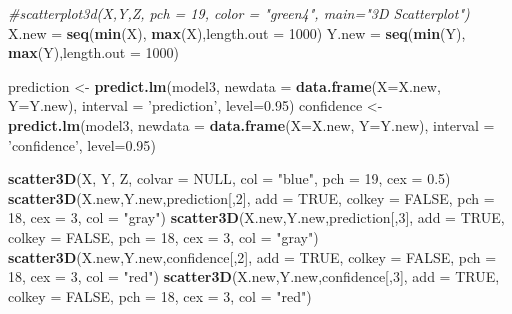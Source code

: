 \documentclass[]{article}
\newenvironment{Shaded}{\begin{snugshade}}{\end{snugshade}}
\newcommand{\KeywordTok}[1]{\textcolor[rgb]{0.13,0.29,0.53}{\textbf{{#1}}}}
\newcommand{\DataTypeTok}[1]{\textcolor[rgb]{0.13,0.29,0.53}{{#1}}}
\newcommand{\DecValTok}[1]{\textcolor[rgb]{0.00,0.00,0.81}{{#1}}}
\newcommand{\FloatTok}[1]{\textcolor[rgb]{0.00,0.00,0.81}{{#1}}}
\newcommand{\StringTok}[1]{\textcolor[rgb]{0.31,0.60,0.02}{{#1}}}
\newcommand{\CommentTok}[1]{\textcolor[rgb]{0.56,0.35,0.01}{\textit{{#1}}}}
\newcommand{\OtherTok}[1]{\textcolor[rgb]{0.56,0.35,0.01}{{#1}}}
\newcommand{\NormalTok}[1]{{#1}}
\begin{document}
\begin{Shaded}
\begin{Highlighting}[]
\CommentTok{#scatterplot3d(X,Y,Z, pch = 19, color = "green4", main="3D Scatterplot")}
\NormalTok{X.new =}\StringTok{ }\KeywordTok{seq}\NormalTok{(}\KeywordTok{min}\NormalTok{(X), }\KeywordTok{max}\NormalTok{(X),}\DataTypeTok{length.out =} \DecValTok{1000}\NormalTok{)}
\NormalTok{Y.new =}\StringTok{ }\KeywordTok{seq}\NormalTok{(}\KeywordTok{min}\NormalTok{(Y), }\KeywordTok{max}\NormalTok{(Y),}\DataTypeTok{length.out =} \DecValTok{1000}\NormalTok{)}

\NormalTok{prediction <-}\StringTok{ }\KeywordTok{predict.lm}\NormalTok{(model3, }\DataTypeTok{newdata =} \KeywordTok{data.frame}\NormalTok{(}\DataTypeTok{X=}\NormalTok{X.new, }\DataTypeTok{Y=}\NormalTok{Y.new),}
                         \DataTypeTok{interval =} \StringTok{'prediction'}\NormalTok{, }\DataTypeTok{level=}\FloatTok{0.95}\NormalTok{)}
\NormalTok{confidence <-}\StringTok{ }\KeywordTok{predict.lm}\NormalTok{(model3, }\DataTypeTok{newdata =} \KeywordTok{data.frame}\NormalTok{(}\DataTypeTok{X=}\NormalTok{X.new, }\DataTypeTok{Y=}\NormalTok{Y.new),}
                         \DataTypeTok{interval =} \StringTok{'confidence'}\NormalTok{, }\DataTypeTok{level=}\FloatTok{0.95}\NormalTok{)}


\KeywordTok{scatter3D}\NormalTok{(X, Y, Z, }\DataTypeTok{colvar =} \OtherTok{NULL}\NormalTok{, }\DataTypeTok{col =} \StringTok{"blue"}\NormalTok{,}
          \DataTypeTok{pch =} \DecValTok{19}\NormalTok{, }\DataTypeTok{cex =} \FloatTok{0.5}\NormalTok{)}
\KeywordTok{scatter3D}\NormalTok{(X.new,Y.new,prediction[,}\DecValTok{2}\NormalTok{], }\DataTypeTok{add =} \OtherTok{TRUE}\NormalTok{, }\DataTypeTok{colkey =} \OtherTok{FALSE}\NormalTok{, }
         \DataTypeTok{pch =} \DecValTok{18}\NormalTok{, }\DataTypeTok{cex =} \DecValTok{3}\NormalTok{, }\DataTypeTok{col =} \StringTok{"gray"}\NormalTok{)}
\KeywordTok{scatter3D}\NormalTok{(X.new,Y.new,prediction[,}\DecValTok{3}\NormalTok{], }\DataTypeTok{add =} \OtherTok{TRUE}\NormalTok{, }\DataTypeTok{colkey =} \OtherTok{FALSE}\NormalTok{, }
         \DataTypeTok{pch =} \DecValTok{18}\NormalTok{, }\DataTypeTok{cex =} \DecValTok{3}\NormalTok{, }\DataTypeTok{col =} \StringTok{"gray"}\NormalTok{)}
\KeywordTok{scatter3D}\NormalTok{(X.new,Y.new,confidence[,}\DecValTok{2}\NormalTok{], }\DataTypeTok{add =} \OtherTok{TRUE}\NormalTok{, }\DataTypeTok{colkey =} \OtherTok{FALSE}\NormalTok{, }
         \DataTypeTok{pch =} \DecValTok{18}\NormalTok{, }\DataTypeTok{cex =} \DecValTok{3}\NormalTok{, }\DataTypeTok{col =} \StringTok{"red"}\NormalTok{)}
\KeywordTok{scatter3D}\NormalTok{(X.new,Y.new,confidence[,}\DecValTok{3}\NormalTok{], }\DataTypeTok{add =} \OtherTok{TRUE}\NormalTok{, }\DataTypeTok{colkey =} \OtherTok{FALSE}\NormalTok{, }
         \DataTypeTok{pch =} \DecValTok{18}\NormalTok{, }\DataTypeTok{cex =} \DecValTok{3}\NormalTok{, }\DataTypeTok{col =} \StringTok{"red"}\NormalTok{)}
\end{Highlighting}
\end{Shaded}
\end{document}
